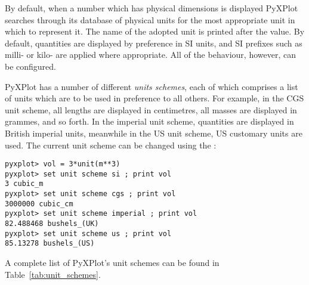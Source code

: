 By default, when a number which has physical dimensions is displayed PyXPlot
searches through its database of physical units for the most appropriate unit
in which to represent it. The name of the adopted unit is printed after the
value. By default, quantities are displayed by preference in SI units, and SI
prefixes such as milli- or kilo- are applied where appropriate. All of the
behaviour, however, can be configured.

PyXPlot has a number of different {\it units schemes}, each of which comprises a list of units which are to be used in
preference to all others. For example, in the CGS unit scheme, all lengths are displayed in centimetres, all masses
are displayed in grammes, and so forth. In the imperial unit
scheme, quantities are displayed in
British imperial units, meanwhile in the US unit scheme, US customary units are
used. The current unit scheme can be changed using the :

\begin{verbatim}
pyxplot> vol = 3*unit(m**3)
pyxplot> set unit scheme si ; print vol
3 cubic_m
pyxplot> set unit scheme cgs ; print vol
3000000 cubic_cm
pyxplot> set unit scheme imperial ; print vol
82.488468 bushels_(UK)
pyxplot> set unit scheme us ; print vol
85.13278 bushels_(US)
\end{verbatim}

\noindent A complete list of PyXPlot's unit schemes can be found in
Table~\ref{tab:unit_schemes}.

\begin{table}
\caption{A list of PyXPlot's unit schemes.}
\label{tab:unit_schemes}
\end{table}

